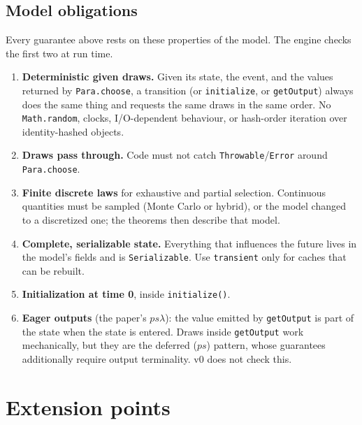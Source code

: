 \documentclass[11pt]{article}
\newcommand{\code}[1]{\texttt{#1}}
\begin{document}
\subsection{Model obligations}
Every guarantee above rests on these properties of the model. The engine checks the first two at run time.
\begin{enumerate}[label=\textbf{M\arabic*.}]
\item \textbf{Deterministic given draws.} Given its state, the event, and the values returned by \code{Para.choose},
  a transition (or \code{initialize}, or \code{getOutput}) always does the same thing and requests the same draws in the
  same order. No \code{Math.random}, clocks, I/O-dependent behaviour, or hash-order iteration over identity-hashed objects.
\item \textbf{Draws pass through.} Code must not catch \code{Throwable}/\code{Error} around \code{Para.choose}.
\item \textbf{Finite discrete laws} for exhaustive and partial selection. Continuous quantities must be sampled
  (Monte Carlo or hybrid), or the model changed to a discretized one; the theorems then describe that model.
\item \textbf{Complete, serializable state.} Everything that influences the future lives in the model's fields and
  is \code{Serializable}. Use \code{transient} only for caches that can be rebuilt.
\item \textbf{Initialization at time 0}, inside \code{initialize()}.
\item \textbf{Eager outputs} (the paper's $ps\lambda$): the value emitted by \code{getOutput} is part of the state when the
  state is entered. Draws inside \code{getOutput} work mechanically, but they are the deferred ($ps$) pattern, whose
  guarantees additionally require output terminality. v0 does not check this.
\end{enumerate}

\section{Extension points}
\end{document}
